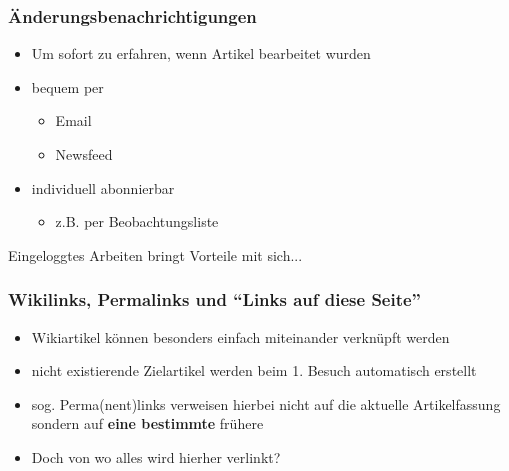 \documentclass{beamer}
\begin{document}
\begin{frame}
  \frametitle{Änderungsbenachrichtigungen}

  \begin{itemize}
    \item Um sofort zu erfahren, wenn Artikel bearbeitet wurden
    \item bequem per

    \begin{itemize}
      \item Email
      \item Newsfeed
    \end{itemize}
    \item individuell abonnierbar

    \begin{itemize}
      \item z.B. per Beobachtungsliste
    \end{itemize}
  \end{itemize}

Eingeloggtes Arbeiten bringt Vorteile mit sich...
\end{frame}

\begin{frame}
  \frametitle{Wikilinks, Permalinks und “Links auf diese Seite”}

  \begin{itemize}
    \item Wikiartikel können besonders einfach miteinander verknüpft werden
    \item nicht existierende Zielartikel werden beim 1. Besuch automatisch erstellt
    \item sog. Perma(nent)links verweisen hierbei nicht auf die aktuelle Artikelfassung sondern auf \textbf{eine bestimmte} frühere
    \item Doch von wo alles wird hierher verlinkt?
  \end{itemize}
\end{frame}
\end{document}
